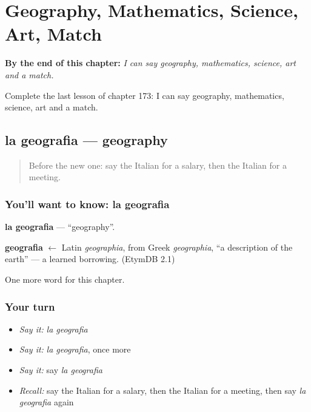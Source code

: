 
\chapter{Geography, Mathematics, Science, Art, Match}
\label{ch:it-geography-mathematics-science-art-match}

\begin{chapteropening}
\textbf{By the end of this chapter:} \emph{I can say geography, mathematics, science, art and a match.}

Complete the last lesson of chapter 173: I can say geography, mathematics, science, art and a match.
\end{chapteropening}

\section[la geografia]{la geografia — geography}

\label{lesson:IT-C173-geografia}



\begin{quote}
Before the new one: say the Italian for a salary, then the Italian for a meeting.
\end{quote}

\subsection*{You'll want to know: la geografia}
\textbf{la geografia} — \textquotedblleft{}geography\textquotedblright{}.

\begin{cousinweb}
\textbf{geografia} $\leftarrow$ Latin \emph{geographia}, from Greek \emph{geographia}, \textquotedblleft{}a description of the earth\textquotedblright{} — a learned borrowing. (EtymDB 2.1)
\end{cousinweb}

\begin{grammarlens}[title={What you've built}]
One more word for this chapter.
\end{grammarlens}

\subsection*{Your turn}
\begin{itemize}
\raggedright
  \item \emph{Say it:} \emph{la geografia}
  \item \emph{Say it:} \emph{la geografia}, once more
  \item \emph{Say it:} say \emph{la geografia}
  \item \emph{Recall:} say the Italian for a salary, then the Italian for a meeting, then say \emph{la geografia} again
\end{itemize}

